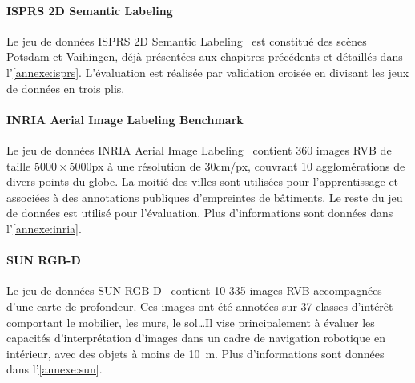 \paragraph{ISPRS 2D Semantic Labeling}

Le jeu de données ISPRS 2D Semantic Labeling~\cite{rottensteiner_isprs_2012} est constitué des scènes Potsdam et Vaihingen, déjà présentées aux chapitres précédents et détaillés dans l'\cref{annexe:isprs}. L'évaluation est réalisée par validation croisée en divisant les jeux de données en trois plis.

\paragraph{INRIA Aerial Image Labeling Benchmark}
Le jeu de données INRIA Aerial Image Labeling~\cite{maggiori_can_2017} contient 360 images RVB de taille $5000\times5000$px à une résolution de 30cm/px, couvrant 10 agglomérations de divers points du globe. La moitié des villes sont utilisées pour l'apprentissage et associées à des annotations publiques d'empreintes de bâtiments. Le reste du jeu de données est utilisé pour l'évaluation. Plus d'informations sont données dans l'\cref{annexe:inria}.

\paragraph{SUN RGB-D}
Le jeu de données SUN RGB-D~\cite{song_sun_2015} contient 10 335 images RVB accompagnées d'une carte de profondeur. Ces images ont été annotées sur 37 classes d'intérêt comportant le mobilier, les murs, le sol\dots Il vise principalement à évaluer les capacités d'interprétation d'images dans un cadre de navigation robotique en intérieur, avec des objets à moins de \SI{10}{\meter}. Plus d'informations sont données dans l'\cref{annexe:sun}.


